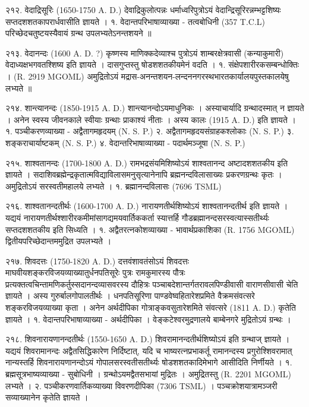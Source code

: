 २१२. वेदाद्रिसूरिः (1650-1750 A. D.)
देवाद्रिकुलोत्पन्नः धर्माध्वरिपुत्रोऽयं वेदान्द्रिसूरिरन्नम्भट्टशिष्यः सप्तदशशतकापरार्धवासीति ज्ञायते ।
१. वेदान्तपरिभाषाव्याख्या - तत्वबोधिनी (357 T.C.L) परिच्छेदचतुष्टयस्यैवायं ग्रन्थ उपलभ्यतेऽनन्तशयने ॥

२१३. वेदानन्दः (1600 A. D. ?)
कृष्णस्य माणिक्कदेव्याश्च पुत्रोऽयं शाम्बरक्षेत्रवासी (कन्याकुमारी) वेदाध्यक्षभगवतश्शिष्य इति ज्ञायते । दासगुप्तस्तु षोडशशतकीयमेनं वदति ।
१. संक्षेपशारीरकसम्बन्धोक्तिः । (R. 2919 MGOML)
अमुद्रितोऽयं मद्रास-अनन्तशयन-लन्दननगरस्थभारतकार्यालयपुस्तकालयेषु लभ्यते ॥

२१४. शान्त्यानन्दः (1850-1915 A. D.)
शान्त्यानन्दोऽयमाधुनिकः । अस्याचार्यादि ग्रन्थादस्मात् न ज्ञायते । अनेन स्वस्य जीवनकाले स्वीयाः ग्रन्थाः प्राकाश्यं नीताः । अस्य कालः (1915 A. D.) इति ज्ञायते ।
१. पञ्चीकरणव्याख्या - अद्वैतागमहृदयम् (N. S. P.)
२. अद्वैतागमहृदयसंग्राहकश्लोकाः (N. S. P.)
३. शङ्कराचार्याष्टकम् (N. S. P.)
४. वेदान्तरिभाषाव्याख्या - पदार्थमञ्जूषा (N. S. P.)

२१५. शाश्वतानन्दः (1700-1800 A. D.)
रामभद्रसंयमिशिष्योऽयं शाश्वतानन्द अष्टादशशतकीय इति ज्ञायते । सदाशिवब्रह्मेन्द्रकृतात्मविद्याविलासमनुसृत्यानेनापि ब्रह्मनन्दविलासाख्यः प्रकरणग्रन्थः कृतः । अमुद्रितोऽयं सरस्वतीमहालये लभ्यते ।
१. ब्रह्मानन्दविलासः (7696 TSML)

२१६. शाश्वतानन्दतीर्थः (1600-1700 A. D.)
नारायणतीर्थशिष्योऽयं शाश्वतानन्दतीर्थ इति ज्ञायते । यद्ययं नारायणतीर्थश्शारीरकमीमांसागद्यमयवार्तिककर्ता स्यात्तर्हि गौडब्रह्मानन्दसरस्वत्यास्सतीर्थ्यः सप्तदशशतकीय इति सिध्यति । 
१. अद्वैतरत्नकोशव्याख्या - भावार्थप्रकाशिका (R. 1756 MGOML) द्वितीयपरिच्छेदान्तममुद्रित उपलभ्यते ।

२१७. शिवदत्तः (1750-1820 A. D.)
दत्तवंशावतंसोऽयं शिवदत्तः माघवीयशङ्करविजयव्याख्यातुर्धनपतिसूरेः पुत्रः रामकुमारस्य पौत्रः प्रत्यक्तत्वचिन्तामणिकर्तुस्सदानन्दव्यासवरस्य दौहित्रः पञ्चाबदेशान्तर्गतरावलपिण्डीवासी वाराणसीवासी चेति ज्ञायते । अस्य गुरुर्बालगोपालतीर्थः । धनपतिसूरिणा पाण्डवेष्वहितारेशप्रमिते वैक्रमसंवत्सरे शङ्करविजयव्याख्या कृता । अनेन अर्थदीपिका गोत्राङ्कवसुतारेशमिते संवत्सरे (1811 A. D.) कृतेति ज्ञायते ।
१. वेदान्तपरिभाषाव्याख्या - अर्थदीपिका । वेङ्कटेश्वरमुद्रणालये बाम्बेनगरे मुद्रितोऽयं ग्रन्थः ।

२१८. शिवनारायणानन्दतीर्थः (1550-1650 A. D.)
शिवरामानन्दतीर्थशिष्योऽयं इति ग्रन्थाज् ज्ञायते । यद्ययं शिवरामानन्दः अद्वैतसिद्धिकारेण निर्दिष्टात्, यदि च भाष्यरत्नप्रभाकर्तू रामानन्दस्य प्रगुरोश्शिवरामात् नान्यस्तर्हि शिवनारायणानन्दोऽयं गोपालसरस्वतीसतीर्थ्यः षोडशशतकादिमेभागे आसीदिति निर्णीयते ।
१. ब्रह्मसूत्रभाष्यव्याख्या - सुबोधिनी । ग्रन्थोऽयमद्वैतसभायां मुद्रितः । अमुद्रितस्तु (R. 2201 MGOML) लभ्यते ।
२. पञ्चीकरणवार्तिकव्याख्या विवरणदीपिका (7306 TSML) । पञ्चक्रोशयात्रामञ्जरी सव्याख्यानेन कृतेति ज्ञायते ।


